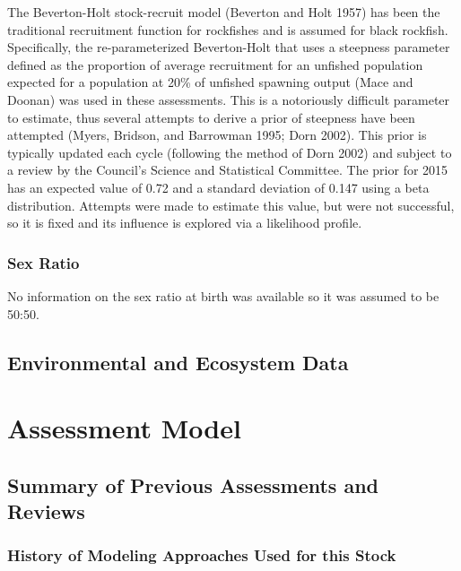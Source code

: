 \documentclass[11pt,
  english,
  letterpaper,
]{article}
\begin{document}
The Beverton-Holt stock-recruit model (Beverton and Holt 1957) has been the traditional recruitment function for rockfishes and is assumed for black rockfish. Specifically, the re-parameterized Beverton-Holt that uses a steepness parameter defined as the proportion of average recruitment for an unfished population expected for a population at 20\% of unfished spawning output (Mace and Doonan) was used in these assessments. This is a notoriously difficult parameter to estimate, thus several attempts to derive a prior of steepness have been attempted (Myers, Bridson, and Barrowman 1995; Dorn 2002). This prior is typically updated each cycle (following the method of Dorn 2002) and subject to a review by the Council's Science and Statistical Committee. The prior for 2015 has an expected value of 0.72 and a standard deviation of 0.147 using a beta distribution. Attempts were made to estimate this value, but were not successful, so it is fixed and its influence is explored via a likelihood profile.

\hypertarget{sex-ratio}{%
\subsubsection{Sex Ratio}\label{sex-ratio}}

No information on the sex ratio at birth was available so it was assumed to be 50:50.

\hypertarget{environmental-and-ecosystem-data}{%
\subsection{Environmental and Ecosystem Data}\label{environmental-and-ecosystem-data}}

\hypertarget{assessment-model}{%
\section{Assessment Model}\label{assessment-model}}

\hypertarget{summary-of-previous-assessments-and-reviews}{%
\subsection{Summary of Previous Assessments and Reviews}\label{summary-of-previous-assessments-and-reviews}}

\hypertarget{history-of-modeling-approaches-used-for-this-stock}{%
\subsubsection{History of Modeling Approaches Used for this Stock}\label{history-of-modeling-approaches-used-for-this-stock}}
\end{document}
